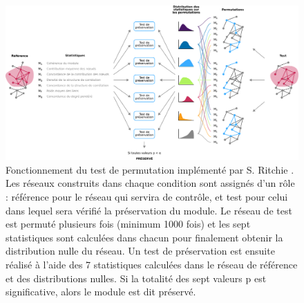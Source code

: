 \begin{figure}
    \centering
    \includegraphics[width=\textwidth]{img/intro/3_coexpr/intro_3_coexpr_netrep_permut.pdf}
    \caption[Fonctionnement du test de permutation implémenté par S. Ritchie.]{Fonctionnement du test de permutation implémenté par S. Ritchie \cite{Ritchie2016}. Les réseaux construits dans chaque condition sont assignés d'un rôle : référence pour le réseau qui servira de contrôle, et test pour celui dans lequel sera vérifié la préservation du module. Le réseau de test est permuté plusieurs fois (minimum 1000 fois) et les sept statistiques sont calculées dans chacun pour finalement obtenir la distribution nulle du réseau. Un test de préservation est ensuite réalisé à l'aide des 7 statistiques calculées dans le réseau de référence et des distributions nulles. Si la totalité des sept valeurs p est significative, alors le module est dit préservé.}
    \label{fig:permutation_test}
\end{figure}



